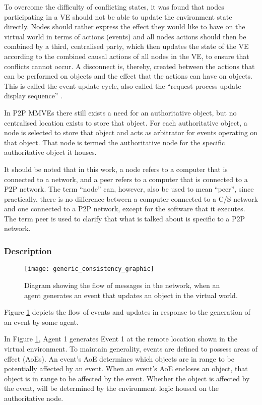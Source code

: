 To overcome the difficulty of conflicting states, it was found that nodes participating in a VE should not be able to update the environment state directly. Nodes should rather express the effect they would like to have on the virtual world in terms of actions (events) and all nodes actions should then be combined by a third, centralised party, which then updates the state of the VE according to the combined causal actions of all nodes in the VE, to ensure that conflicts cannot occur. A disconnect is, thereby, created between the actions that can be performed on objects and the effect that the actions can have on objects. This is called the event-update cycle, also called the  ``request-process-update-display sequence'' \cite{Hu_voronoi_IM}.

In P2P MMVEs there still exists a need for an authoritative object, but no centralised location exists to store that object. For each authoritative object, a node is selected to store that object and acts as arbitrator for events operating on that object. That node is termed the authoritative node for the specific authoritative object it houses.

It should be noted that in this work, a node refers to a computer that is connected to a network, and a peer refers to a computer that is connected to a P2P network. The term ``node'' can, however, also be used to mean ``peer'', since  practically, there is no difference between a computer connected to a C/S network and one connected to a P2P network, except for the software that it executes. The term peer is used to clarify that what is talked about is specific to a P2P network.

\subsubsection{Description}

\begin{figure}[htbp]
 \centering
 \texttt{[image: generic\_consistency\_graphic]}
 \caption{Diagram showing the flow of messages in the network, when an agent generates an event that updates an object in the virtual world.}
 \label{fig_event_update_flow_graphic}
\end{figure}

Figure \ref{fig_event_update_flow_graphic} depicts the flow of events and updates in response to the generation of an event by some agent.

In Figure \ref{fig_event_update_flow_graphic}, Agent 1 generates Event 1 at the remote location shown in the virtual environment. To maintain generality, events are defined to possess areas of effect (AoEs). An event's AoE determines which objects are in range to be potentially affected by an event. When an event's AoE encloses an object, that object is in range to be affected by the event. Whether the object is affected by the event, will be determined by the environment logic housed on the authoritative node.

